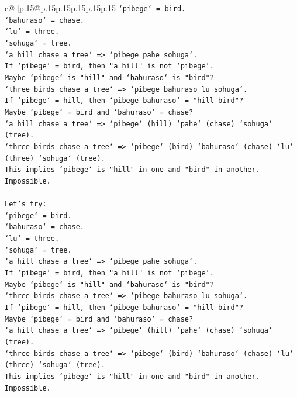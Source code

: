 \documentclass{article}
\begin{document}
{\begin{supertabular}{c@{$\;$}|p{.15\linewidth}@{}p{.15\linewidth}p{.15\linewidth}p{.15\linewidth}p{.15\linewidth}p{.15\linewidth}}
{{{\texttt{`pibege` = bird.} \\
\texttt{`bahuraso` = chase.} \\
\texttt{`lu` = three.} \\
\texttt{`sohuga` = tree.} \\
\texttt{`a hill chase a tree` => `pibege pahe sohuga`.} \\
\texttt{If `pibege` = bird, then "a hill" is not `pibege`.} \\
\texttt{Maybe `pibege` is "hill" and `bahuraso` is "bird"?} \\
\texttt{`three birds chase a tree` => `pibege bahuraso lu sohuga`.} \\
\texttt{If `pibege` = hill, then `pibege bahuraso` = "hill bird"?} \\
\texttt{Maybe `pibege` = bird and `bahuraso` = chase?} \\
\texttt{`a hill chase a tree` => `pibege` (hill) `pahe` (chase) `sohuga` (tree).} \\
\texttt{`three birds chase a tree` => `pibege` (bird) `bahuraso` (chase) `lu` (three) `sohuga` (tree).} \\
\texttt{This implies `pibege` is "hill" in one and "bird" in another. Impossible.} \\
\\ 
\texttt{Let's try:} \\
\texttt{`pibege` = bird.} \\
\texttt{`bahuraso` = chase.} \\
\texttt{`lu` = three.} \\
\texttt{`sohuga` = tree.} \\
\texttt{`a hill chase a tree` => `pibege pahe sohuga`.} \\
\texttt{If `pibege` = bird, then "a hill" is not `pibege`.} \\
\texttt{Maybe `pibege` is "hill" and `bahuraso` is "bird"?} \\
\texttt{`three birds chase a tree` => `pibege bahuraso lu sohuga`.} \\
\texttt{If `pibege` = hill, then `pibege bahuraso` = "hill bird"?} \\
\texttt{Maybe `pibege` = bird and `bahuraso` = chase?} \\
\texttt{`a hill chase a tree` => `pibege` (hill) `pahe` (chase) `sohuga` (tree).} \\
\texttt{`three birds chase a tree` => `pibege` (bird) `bahuraso` (chase) `lu` (three) `sohuga` (tree).} \\
\texttt{This implies `pibege` is "hill" in one and "bird" in another. Impossible.} \\
}}}
\end{supertabular}}
\end{document}
